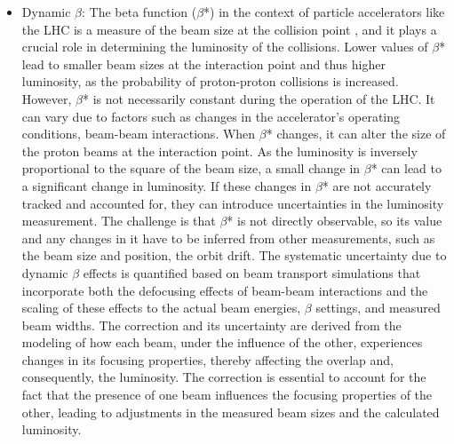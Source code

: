 \begin{itemize}
\item Dynamic $\beta$: The beta function ($\beta$*) in the context of particle accelerators like the LHC is a measure of the beam size at the collision point \cite{CERNVdMOMC}, and it plays a crucial role in determining the luminosity of the collisions. Lower values of $\beta$* lead to smaller beam sizes at the interaction point and thus higher luminosity, as the probability of proton-proton collisions is increased. However, $\beta$* is not necessarily constant during the operation of the LHC. It can vary due to factors such as changes in the accelerator's operating conditions, beam-beam interactions. %
 When $\beta$* changes, it can alter the size of the proton beams at the interaction point. As the luminosity is inversely proportional to the square of the beam size, a small change in $\beta$* can lead to a significant change in luminosity. If these changes in $\beta$* are not accurately tracked and accounted for, they can introduce uncertainties in the luminosity measurement. The challenge is that $\beta$* is not directly observable, so its value and any changes in it have to be inferred from other measurements, such as the beam size and position, the orbit drift.
The systematic uncertainty due to dynamic $\beta$ effects is quantified based on beam transport simulations that incorporate both the defocusing effects of beam-beam interactions and the scaling of these effects to the actual beam energies, $\beta$ settings, and measured beam widths. The correction and its uncertainty are derived from the modeling of how each beam, under the influence of the other, experiences changes in its focusing properties, thereby affecting the overlap and, consequently, the luminosity. The correction is essential to account for the fact that the presence of one beam influences the focusing properties of the other, leading to adjustments in the measured beam sizes and the calculated luminosity.
 

\end{itemize}
